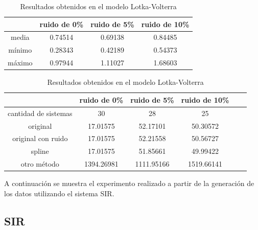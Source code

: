 \begin{table}[!h]
    \centering
    \caption{Resultados obtenidos en el modelo Lotka-Volterra}

    \begin{tabular}{|c|c|c|c|}
        \hline
               & \textbf{ruido de 0\%} & \textbf{ruido de 5\%} & \textbf{ruido de 10\%} \\
        \hline
        media  & 0.74514               & 0.69138               & 0.84485                \\
        \hline
        mínimo & 0.28343               & 0.42189               & 0.54373                \\
        \hline
        máximo & 0.97944               & 1.11027               & 1.68603                \\
        \hline
    \end{tabular}

    \begin{tabular}{|c|c|c|c|c|c|}
        \hline
                             & \textbf{ruido de 0\%} & \textbf{ruido de 5\%} & \textbf{ruido de 10\%} \\
        \hline
        cantidad de sistemas & 30                    & 28                    & 25                     \\
        \hline
        original             & 17.01575              & 52.17101              & 50.30572               \\
        \hline
        original con ruido   & 17.01575              & 52.21558              & 50.56727               \\
        \hline
        spline               & 17.01575              & 51.85661              & 49.99422               \\
        \hline
        otro método          & 1394.26981            & 1111.95166            & 1519.66141             \\
        \hline
    \end{tabular}

    \label{table:experiment_lotka_volterra}
\end{table}

A continuación se muestra el experimento realizado a partir de la generación de los datos utilizando el sistema SIR.

\subsection{SIR}

